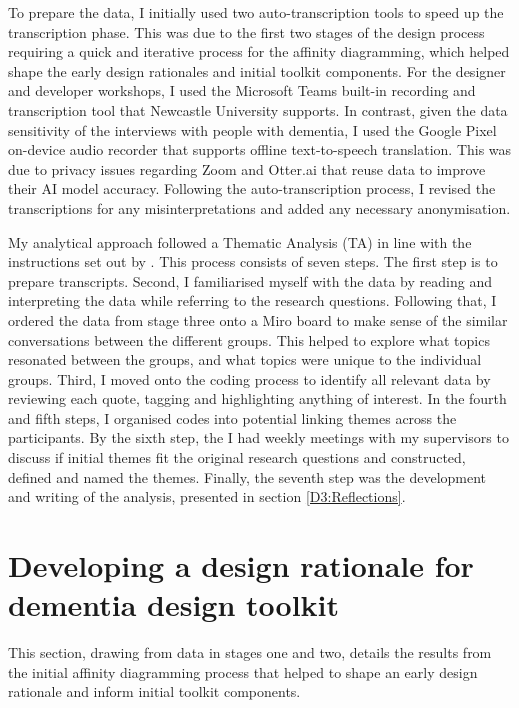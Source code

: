 To prepare the data, I initially used two auto-transcription tools to speed up the transcription phase. This was due to the first two stages of the design process requiring a quick and iterative process for the affinity diagramming, which helped shape the early design rationales and initial toolkit components. For the designer and developer workshops, I used the Microsoft Teams built-in recording and transcription tool that Newcastle University supports. In contrast, given the data sensitivity of the interviews with people with dementia, I used the Google Pixel on-device audio recorder that supports offline text-to-speech translation. This was due to privacy issues regarding Zoom and Otter.ai that reuse data to improve their AI model accuracy. Following the auto-transcription process, I revised the transcriptions for any misinterpretations and added any necessary anonymisation. 

My analytical approach followed a Thematic Analysis (TA) in line with the instructions set out by  \cite{braun_using_2006,braun_one_2020}. This process consists of seven steps. The first step is to prepare transcripts. Second,  I familiarised myself with the data by reading and interpreting the data while referring to the research questions. Following that, I ordered the data from stage three onto a Miro board to make sense of the similar conversations between the different groups. This helped to explore what topics resonated between the groups, and what topics were unique to the individual groups. Third, I moved onto the coding process to identify all relevant data by reviewing each quote, tagging and highlighting anything of interest. In the fourth and fifth steps, I organised codes into potential linking themes across the participants. By the sixth step, the I had weekly meetings with my supervisors to discuss if initial themes fit the original research questions and constructed, defined and named the themes. Finally, the seventh step was the development and writing of the analysis, presented in section \ref{D3:Reflections}.

\section{Developing a design rationale for dementia design toolkit}
\label{D3:Rationale}
This section, drawing from data in stages one and two, details the results from the initial affinity diagramming process that helped to shape an early design rationale and inform initial toolkit components.

